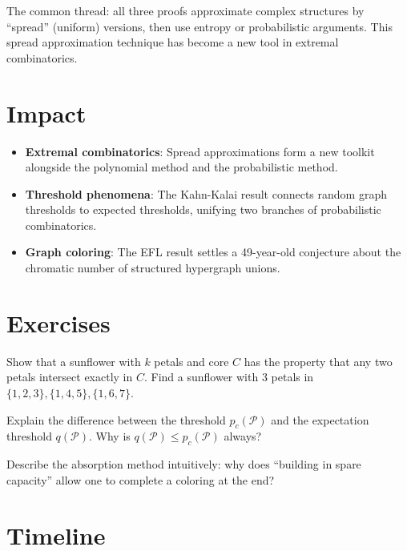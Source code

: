 \begin{highlightbox}
The common thread: all three proofs approximate complex structures by ``spread'' (uniform) versions, then use entropy or probabilistic arguments. This spread approximation technique has become a new tool in extremal combinatorics.
\end{highlightbox}

\section{Impact}
\begin{itemize}
\item \textbf{Extremal combinatorics}: Spread approximations form a new toolkit alongside the polynomial method and the probabilistic method.
\item \textbf{Threshold phenomena}: The Kahn-Kalai result connects random graph thresholds to expected thresholds, unifying two branches of probabilistic combinatorics.
\item \textbf{Graph coloring}: The EFL result settles a 49-year-old conjecture about the chromatic number of structured hypergraph unions.
\end{itemize}

\section{Exercises}

\begin{exercise}[Basic]
Show that a sunflower with $k$ petals and core $C$ has the property that any two petals intersect exactly in $C$. Find a sunflower with 3 petals in $\{1,2,3\}, \{1,4,5\}, \{1,6,7\}$.
\end{exercise}

\begin{exercise}[Intermediate]
Explain the difference between the threshold $p_c(\mathcal{P})$ and the expectation threshold $q(\mathcal{P})$. Why is $q(\mathcal{P}) \le p_c(\mathcal{P})$ always?
\end{exercise}

\begin{exercise}[Challenge]
Describe the absorption method intuitively: why does ``building in spare capacity'' allow one to complete a coloring at the end?
\end{exercise}

\section{Timeline}

